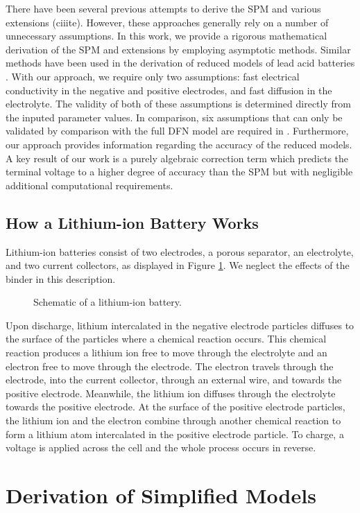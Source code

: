 \documentclass[preprint]{elsarticle}
\begin{document}
There have been several previous attempts to derive the SPM and various extensions (ciiite). However, these approaches generally rely on a number of unnecessary assumptions. In this work, we provide a rigorous mathematical derivation of the SPM and extensions by employing asymptotic methods. Similar methods have been used in the derivation of reduced models of lead acid batteries \cite{tino}. With our approach, we require only two assumptions: fast electrical conductivity in the negative and positive electrodes, and fast diffusion in the electrolyte. The validity of both of these assumptions is determined directly from the inputed parameter values. In comparison, six assumptions that can only be validated by comparison with the full DFN model are required in \cite{Moura2017}. Furthermore, our approach provides information regarding the accuracy of the reduced models. A key result of our work is a purely algebraic correction term which predicts the terminal voltage to a higher degree of accuracy than the SPM but with negligible additional computational requirements. 

\subsection{How a Lithium-ion Battery Works}
Lithium-ion batteries consist of two electrodes, a porous separator, an electrolyte, and two current collectors, as displayed in Figure \ref{fig:liBat}. We neglect the effects of the binder in this description. 
\begin{figure}[h!]
	\centering
	\LiBattery
    \caption{Schematic of a lithium-ion battery.}\label{fig:liBat}
\end{figure} 
Upon discharge, lithium intercalated in the negative electrode particles diffuses to the surface of the particles where a chemical reaction occurs. This chemical reaction produces a lithium ion free to move through the electrolyte and an electron free to move through the electrode. The electron travels through the electrode, into the current collector, through an external wire, and towards the positive electrode. Meanwhile, the lithium ion diffuses through the electrolyte towards the positive electrode. At the surface of the positive electrode particles, the lithium ion and the electron combine through another chemical reaction to form a lithium atom intercalated in the positive electrode particle. To charge, a voltage is applied across the cell and the whole process occurs in reverse.

\section{Derivation of Simplified Models}
\end{document}
